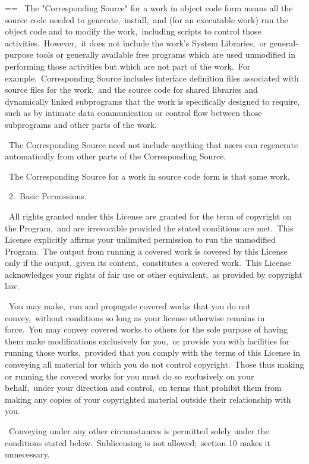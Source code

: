 \documentclass{book}
\makeatletter
\newenvironment{Texinfopreformatted}{%
  \par\GNUTobeylines\obeyspaces\frenchspacing\parskip=\z@\parindent=\z@}{}
{\catcode`\^^M=13 \gdef\GNUTobeylines{\catcode`\^^M=13 \def^^M{\null\par}}}
\newenvironment{Texinfoindented}{\begin{list}{}{}\item\relax}{\end{list}}
\renewcommand{\_}{\Texinfounderscore\discretionary{}{}{}}
\makeatother
\begin{document}
\begin{Texinfoindented}
\begin{Texinfopreformatted}
\  The "Corresponding Source" for a work in object code form means all
the source code needed to generate,\ install,\ and (for an executable
work) run the object code and to modify the work,\ including scripts to
control those activities.\  However,\ it does not include the work's
System Libraries,\ or general-purpose tools or generally available free
programs which are used unmodified in performing those activities but
which are not part of the work.\  For example,\ Corresponding Source
includes interface definition files associated with source files for
the work,\ and the source code for shared libraries and dynamically
linked subprograms that the work is specifically designed to require,
such as by intimate data communication or control flow between those
subprograms and other parts of the work.

\  The Corresponding Source need not include anything that users
can regenerate automatically from other parts of the Corresponding
Source.

\  The Corresponding Source for a work in source code form is that
same work.

\  2.\ Basic Permissions.

\  All rights granted under this License are granted for the term of
copyright on the Program,\ and are irrevocable provided the stated
conditions are met.\  This License explicitly affirms your unlimited
permission to run the unmodified Program.\  The output from running a
covered work is covered by this License only if the output,\ given its
content,\ constitutes a covered work.\  This License acknowledges your
rights of fair use or other equivalent,\ as provided by copyright law.

\  You may make,\ run and propagate covered works that you do not
convey,\ without conditions so long as your license otherwise remains
in force.\  You may convey covered works to others for the sole purpose
of having them make modifications exclusively for you,\ or provide you
with facilities for running those works,\ provided that you comply with
the terms of this License in conveying all material for which you do
not control copyright.\  Those thus making or running the covered works
for you must do so exclusively on your behalf,\ under your direction
and control,\ on terms that prohibit them from making any copies of
your copyrighted material outside their relationship with you.

\  Conveying under any other circumstances is permitted solely under
the conditions stated below.\  Sublicensing is not allowed;\ section 10
makes it unnecessary.


\end{Texinfopreformatted}
\end{Texinfoindented}
\end{document}
